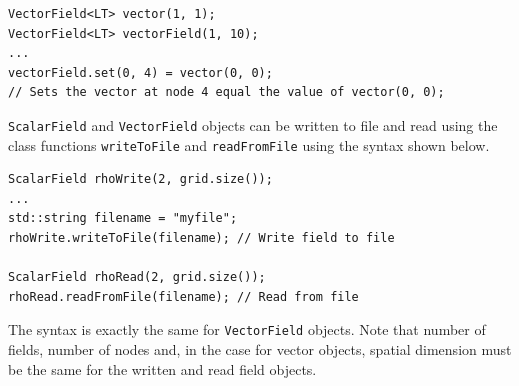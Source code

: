 \documentclass[11pt,a4paper]{report}
\begin{document}
\begin{verbatim}
VectorField<LT> vector(1, 1);
VectorField<LT> vectorField(1, 10);
...
vectorField.set(0, 4) = vector(0, 0);
// Sets the vector at node 4 equal the value of vector(0, 0);  
\end{verbatim}
\texttt{ScalarField} and \texttt{VectorField} objects can be written to file and read using the class functions \texttt{writeToFile} and \texttt{readFromFile} using the syntax shown below.
\begin{verbatim}
ScalarField rhoWrite(2, grid.size());
...
std::string filename = "myfile";
rhoWrite.writeToFile(filename); // Write field to file

ScalarField rhoRead(2, grid.size());
rhoRead.readFromFile(filename); // Read from file
\end{verbatim}
The syntax is exactly the same for \texttt{VectorField} objects. Note that number of fields, number of nodes and, in the case for vector objects, spatial dimension must be the same for the written and read field objects.
\end{document}
